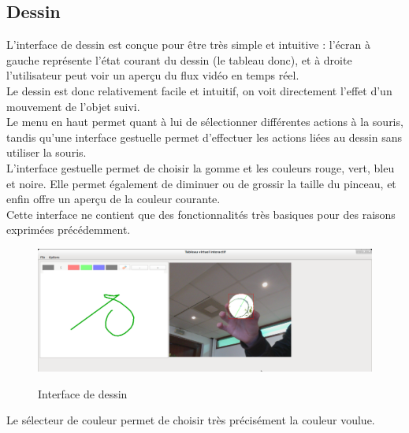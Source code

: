 \documentclass{report}
\begin{document}
			\subsection{Dessin}
			L'interface de dessin est conçue pour être très simple et intuitive : l'écran à gauche représente l'état courant du dessin (le tableau donc), et à droite l'utilisateur peut voir un aperçu du flux vidéo en temps réel. \\
			Le dessin est donc relativement facile et intuitif, on voit directement l'effet d'un mouvement de l'objet suivi. \\
			Le menu en haut permet quant à lui de sélectionner différentes actions à la souris, tandis qu'une interface gestuelle permet d'effectuer les actions liées au dessin sans utiliser la souris. \\
			L'interface gestuelle permet de choisir la gomme et les couleurs rouge, vert, bleu et noire. Elle permet également de diminuer ou de grossir la taille du pinceau, et enfin offre un aperçu de la couleur courante. \\
			Cette interface ne contient que des fonctionnalités très basiques pour des raisons exprimées précédemment. \\
				\begin{figure}[!h]
						\centering
						\includegraphics[scale=0.3]{capture.png}\\
						\caption{Interface de dessin}
						\label{Interface de dessin}
				\end{figure}
				\newpage
				Le sélecteur de couleur permet de choisir très précisément la couleur voulue. \\
\end{document}
